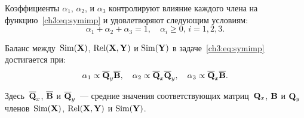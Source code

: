 \documentclass[11pt, a5paper]{dissert}
\begin{document}
Коэффициенты $\alpha_1$, $\alpha_2$, и $\alpha_3$ контролируют влияние каждого члена на функцию~\eqref{ch3:eq:symimp} и удовлетворяют следующим условиям:
\begin{equation*}
	\alpha_1 + \alpha_2 + \alpha_3 = 1, \quad \alpha_i \geq 0, \, i = 1, 2, 3.
\end{equation*}
\begin{statement}
	Баланс между~$\text{Sim}(\mathbf{X})$, $\text{Rel}(\mathbf{X}, \mathbf{Y})$ и $\text{Sim}(\mathbf{Y})$ в  задаче~\eqref{ch3:eq:symimp} достигается при:
	\begin{equation}
	\alpha_1 \propto \overline{\mathbf{Q}}_y \overline{\mathbf{B}}, \quad
	\alpha_2 \propto \overline{\mathbf{Q}}_x \overline{\mathbf{Q}}_y, \quad
	\alpha_3  \propto \overline{\mathbf{Q}}_x \overline{\mathbf{B}}.
	\label{ch3:eq:alpha_3}
	\end{equation}
\end{statement}
Здесь~$\overline{\mathbf{Q}}_x$, $\overline{\mathbf{B}}$ и $\overline{\mathbf{Q}}_y$~--- средние значения соответствующих матриц~$\mathbf{Q}_x$, $\mathbf{B}$ и $\mathbf{Q}_y$ членов~$\text{Sim}(\mathbf{X})$, $\text{Rel}(\mathbf{X}, \mathbf{Y})$ и $\text{Sim}(\mathbf{Y})$.
\end{document}
